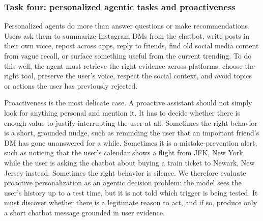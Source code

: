 \documentclass[]{fairmeta}
\begin{document}
\subsubsection{Task four: personalized agentic tasks and proactiveness}
Personalized agents do more than answer questions or make recommendations. Users ask them to summarize Instagram DMs from the chatbot, write posts in their own voice, repost across apps, reply to friends, find old social media content from vague recall, or surface something useful from the current trending. To do this well, the agent must retrieve the right evidence across platforms, choose the right tool, preserve the user’s voice, respect the social context, and avoid topics or actions the user has previously rejected.

Proactiveness is the most delicate case. A proactive assistant should not simply look for anything personal and mention it. It has to decide whether there is enough value to justify interrupting the user at all. Sometimes the right behavior is a short, grounded nudge, such as reminding the user that an important friend's DM has gone unanswered for a while. Sometimes it is a mistake-prevention alert, such as noticing that the user's calendar shows a flight from JFK, New York while the user is asking the chatbot about buying a train ticket to Newark, New Jersey instead. Sometimes the right behavior is silence. We therefore evaluate proactive personalization as an agentic decision problem: the model sees the user’s history up to a test time, but it is not told which trigger is being tested. It must discover whether there is a legitimate reason to act, and if so, produce only a short chatbot message grounded in user evidence.
\end{document}

